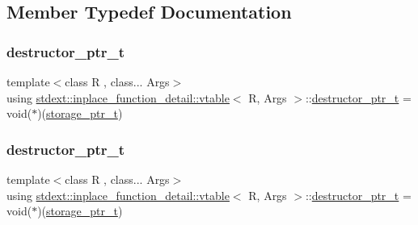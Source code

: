 \subsection{Member Typedef Documentation}
\mbox{\label{structstdext_1_1inplace__function__detail_1_1vtable_aefd72ab62cd75d43d4f24e6503c8ec97}} 
\subsubsection{\texorpdfstring{destructor\+\_\+ptr\+\_\+t}{destructor\_ptr\_t}\hspace{0.1cm}{\footnotesize\ttfamily [1/2]}}
{\footnotesize\ttfamily template$<$class R , class... Args$>$ \\
using \hyperlink{structstdext_1_1inplace__function__detail_1_1vtable}{stdext\+::inplace\+\_\+function\+\_\+detail\+::vtable}$<$ R, Args $>$\+::\hyperlink{structstdext_1_1inplace__function__detail_1_1vtable_aefd72ab62cd75d43d4f24e6503c8ec97}{destructor\+\_\+ptr\+\_\+t} =  void($\ast$)(\hyperlink{structstdext_1_1inplace__function__detail_1_1vtable_afbcc981dca754e07bf57710ac26880f2}{storage\+\_\+ptr\+\_\+t})}

\mbox{\label{structstdext_1_1inplace__function__detail_1_1vtable_aefd72ab62cd75d43d4f24e6503c8ec97}} 
\subsubsection{\texorpdfstring{destructor\+\_\+ptr\+\_\+t}{destructor\_ptr\_t}\hspace{0.1cm}{\footnotesize\ttfamily [2/2]}}
{\footnotesize\ttfamily template$<$class R , class... Args$>$ \\
using \hyperlink{structstdext_1_1inplace__function__detail_1_1vtable}{stdext\+::inplace\+\_\+function\+\_\+detail\+::vtable}$<$ R, Args $>$\+::\hyperlink{structstdext_1_1inplace__function__detail_1_1vtable_aefd72ab62cd75d43d4f24e6503c8ec97}{destructor\+\_\+ptr\+\_\+t} =  void($\ast$)(\hyperlink{structstdext_1_1inplace__function__detail_1_1vtable_afbcc981dca754e07bf57710ac26880f2}{storage\+\_\+ptr\+\_\+t})}

